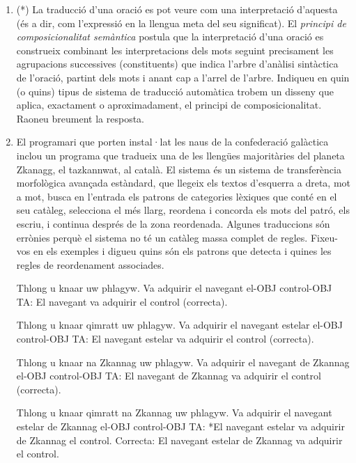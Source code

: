 \begin{enumerate}
\item (*) La traducció d'una oració es pot veure com una interpretació
  d'aquesta (és a dir, com l'expressió en la llengua meta del seu
  significat). El \emph{principi de composicionalitat semàntica}
  postula que la interpretació d'una oració es construeix combinant
  les interpretacions dels mots seguint precisament les agrupacions
  successives (constituents) que indica l'arbre d'anàlisi sintàctica
  de l'oració, partint dels mots i anant cap a l'arrel de
  l'arbre. Indiqueu en quin (o quins) tipus de sistema de traducció
  automàtica trobem un disseny que aplica, exactament o
  aproximadament, el principi de composicionalitat. Raoneu breument la
  resposta.
      
\item \label{ex:zkanagg} El programari que porten instal·lat les naus
  de la confederació galàctica inclou un programa que tradueix una de
  les llengües majoritàries del planeta Zkanagg, el tazkannwat, al
  català. El sistema és un sistema de transferència morfològica
  avançada estàndard, que llegeix els textos d'esquerra a dreta, mot a
  mot, busca en l'entrada els patrons de categories lèxiques que conté
  en el seu catàleg, selecciona el més llarg, reordena i concorda els
  mots del patró, els escriu, i continua després de la zona
  reordenada. Algunes traduccions són errònies perquè el sistema no té
  un catàleg massa complet de regles. Fixeu-vos en els exemples i
  digueu quins són els patrons que detecta i quines les regles de
  reordenament associades.
     \begin{example}
     \gll Thlong u knaar uw phlagyw.
          {Va adquirir} el navegant el-OBJ control-OBJ
     \glt TA: El navegant va adquirir el control (correcta).
     \glend
     \end{example}
     \begin{example}
     \gll Thlong u knaar qimratt uw phlagyw.
          {Va adquirir} el navegant estelar el-OBJ control-OBJ
     \glt TA: El navegant estelar va adquirir el control (correcta).
     \glend
     \end{example}
     \begin{example}
     \gll Thlong u knaar na Zkannag uw phlagyw.
          {Va adquirir} el navegant de Zkannag el-OBJ control-OBJ
     \glt TA: El navegant de Zkannag va adquirir el control (correcta).
     \glend
     \end{example}
     \begin{example}
     \gll Thlong u knaar qimratt na Zkannag uw phlagyw.
          {Va adquirir} el navegant estelar de Zkannag el-OBJ control-OBJ
     \glt TA: *El navegant estelar va adquirir de Zkannag el control.
     \glt Correcta: El navegant estelar de Zkannag va adquirir el control.
     \glend
     \end{example}


\end{enumerate}
